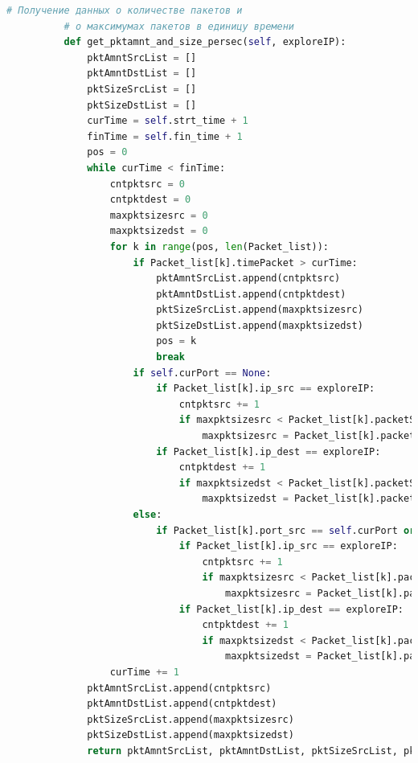 \documentclass[bachelor, och, coursework]{SCWorks}
\begin{document}
\begin{lstlisting}[language=Python]
          # Получение данных о количестве пакетов и
          # о максимумах пакетов в единицу времени
          def get_pktamnt_and_size_persec(self, exploreIP):
              pktAmntSrcList = []
              pktAmntDstList = []
              pktSizeSrcList = []
              pktSizeDstList = []
              curTime = self.strt_time + 1
              finTime = self.fin_time + 1
              pos = 0
              while curTime < finTime:
                  cntpktsrc = 0
                  cntpktdest = 0
                  maxpktsizesrc = 0
                  maxpktsizedst = 0
                  for k in range(pos, len(Packet_list)):
                      if Packet_list[k].timePacket > curTime:
                          pktAmntSrcList.append(cntpktsrc)
                          pktAmntDstList.append(cntpktdest)
                          pktSizeSrcList.append(maxpktsizesrc)
                          pktSizeDstList.append(maxpktsizedst)
                          pos = k
                          break
                      if self.curPort == None:
                          if Packet_list[k].ip_src == exploreIP:
                              cntpktsrc += 1
                              if maxpktsizesrc < Packet_list[k].packetSize:
                                  maxpktsizesrc = Packet_list[k].packetSize
                          if Packet_list[k].ip_dest == exploreIP:
                              cntpktdest += 1
                              if maxpktsizedst < Packet_list[k].packetSize:
                                  maxpktsizedst = Packet_list[k].packetSize
                      else:
                          if Packet_list[k].port_src == self.curPort or Packet_list[k].port_dest == self.curPort:
                              if Packet_list[k].ip_src == exploreIP:
                                  cntpktsrc += 1
                                  if maxpktsizesrc < Packet_list[k].packetSize:
                                      maxpktsizesrc = Packet_list[k].packetSize
                              if Packet_list[k].ip_dest == exploreIP:
                                  cntpktdest += 1
                                  if maxpktsizedst < Packet_list[k].packetSize:
                                      maxpktsizedst = Packet_list[k].packetSize
                  curTime += 1
              pktAmntSrcList.append(cntpktsrc)
              pktAmntDstList.append(cntpktdest)
              pktSizeSrcList.append(maxpktsizesrc)
              pktSizeDstList.append(maxpktsizedst)
              return pktAmntSrcList, pktAmntDstList, pktSizeSrcList, pktSizeDstList
      

\end{lstlisting}
\end{document}
